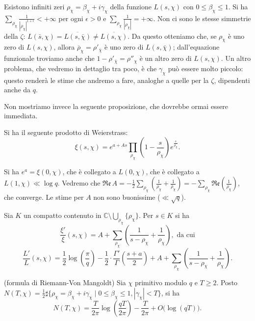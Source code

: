 Esistono infiniti zeri $\rho_\chi=\beta_\chi+i\gamma_\chi$ della funzione $L(s,\chi)$ con $0 \le \beta_\chi \le 1$. Si ha $\displaystyle \sum_{\rho_\chi} \frac{1}{|\rho_\chi|^{1+\epsilon}}<+\infty$ per ogni $\epsilon>0$ e $\displaystyle \sum_{\rho_\chi} \frac{1}{|\rho_\chi|}=+\infty$.
Non ci sono le stesse simmetrie della $\zeta$: $L(\bar{s},\chi)=\overline{L(s,\bar{\chi})}\not=\overline{L(s,\chi)}$. Da questo otteniamo che, se $\rho_\chi$ è uno zero di $L(s,\chi)$, allora $\bar{\rho}_\chi=\rho'_{\bar{\chi}}$ è uno zero di $L(s,\bar{\chi})$; dall'equazione funzionale troviamo anche che $1-\rho'_{\bar{\chi}}=\rho''_\chi$ è un altro zero di $L(s,\chi)$.
Un altro problema, che vedremo in dettaglio tra poco, è che $\gamma_\chi$ può essere molto piccolo: questo renderà le stime che andremo a fare, analoghe a quelle per la $\zeta$, dipendenti anche da $q$.

Non mostriamo invece la seguente proposizione, che dovrebbe ormai essere immediata.

\begin{prop}
  Si ha il seguente prodotto di Weierstrass:
  $$\xi(s,\chi)=e^{a+As}\prod_{\rho_\chi}\left(1-\frac{s}{\rho_\chi}\right)e^{\frac{s}{\rho_\chi}}.$$
\end{prop}

Si ha $e^a=\xi(0,\chi)$, che è collegato a $L(0,\chi)$, che è collegato a $L(1,\chi) \ll \log{q}$. Vedremo che $\displaystyle \mathfrak{Re}\,A=-\frac{1}{2}\sum_{\rho_\chi}\left(\frac{1}{\rho_\chi}+\frac{1}{\bar{\rho}_\chi}\right)=-\sum_{\rho_\chi} \mathfrak{Re}\left(\frac{1}{\rho_\chi}\right)$, che converge. Le stime per $A$ non sono buonissime ($\ll \sqrt{q}$).

\begin{cor} \label{derlogxielle}
  Sia $K$ un compatto contenuto in $\mathbb{C} \setminus \displaystyle \bigcup_{\rho_\chi} \{\rho_\chi\}$. Per $s \in K$ si ha
  $$\frac{\xi'}{\xi}(s,\chi)=A+\sum_{\rho_\chi} \left(\frac{1}{s-\rho_\chi}+\frac{1}{\rho_\chi}\right), \text{ da cui}$$
  $$\frac{L'}{L}(s,\chi)=\frac{1}{2}\log\left(\frac{\pi}{q}\right)-\frac{1}{2}\cdot\frac{\Gamma'}{\Gamma}\left(\frac{s+a}{2}\right)+A+\sum_{\rho_\chi}\left(\frac{1}{s-\rho_\chi}+\frac{1}{\rho_\chi}\right).$$
\end{cor}

\begin{prop}
  (formula di Riemann-Von Mangoldt) Sia $\chi$ primitivo modulo $q$ e $T \ge 2$. Posto $N(T,\chi)=\frac{1}{2}\sharp\{\rho_\chi=\beta_\chi+i\gamma_\chi \mid 0 \le \beta_\chi \le 1, |\gamma_\chi|<T\}$, si ha
  $$N(T,\chi)=\frac{T}{2\pi}\log\left(\frac{qT}{2\pi}\right)-\frac{T}{2\pi}+O\big(\log(qT)\big).$$
\end{prop}

